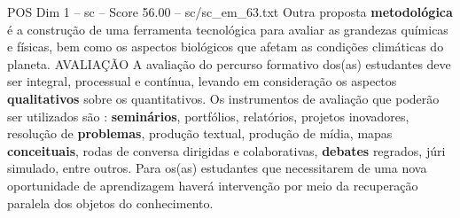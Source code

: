 \begin{textsample}{POS Dim 1 – sc – Score 56.00 – sc/sc\_em\_63.txt}
Outra proposta \textbf{metodológica} é a construção de uma ferramenta tecnológica para avaliar as grandezas químicas e físicas, bem como os aspectos biológicos que afetam as condições climáticas do planeta.
AVALIAÇÃO A avaliação do percurso formativo dos(as) estudantes deve ser integral, processual e contínua, levando em consideração os aspectos \textbf{qualitativos} sobre os quantitativos.
Os instrumentos de avaliação que poderão ser utilizados são : \textbf{seminários}, portfólios, relatórios, projetos inovadores, resolução de \textbf{problemas}, produção textual, produção de mídia, mapas \textbf{conceituais}, rodas de conversa dirigidas e colaborativas, \textbf{debates} regrados, júri simulado, entre outros.
Para os(as) estudantes que necessitarem de uma nova oportunidade de aprendizagem haverá intervenção por meio da recuperação paralela dos objetos do conhecimento.

\end{textsample}
